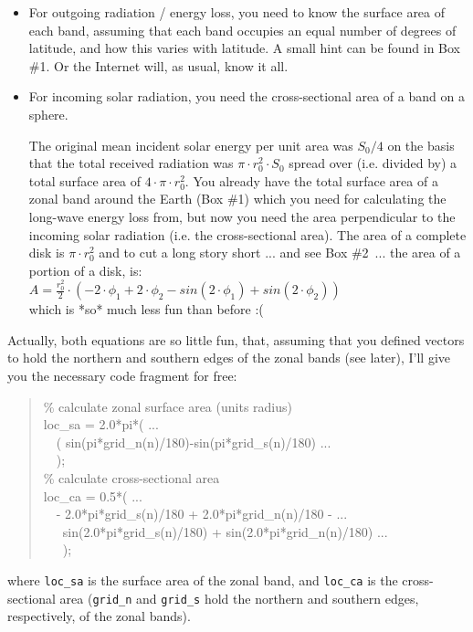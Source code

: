 \documentclass{tufte-book} %
\newenvironment{docspec}{\begin{quotation}\ttfamily\parskip0pt\parindent0pt\ignorespaces}{\end{quotation}}
\begin{document}
\begin{itemize}[noitemsep]
\item For outgoing radiation / energy loss, you need to know the surface area of each band, assuming that each band occupies an equal number of degrees of latitude, and how this varies with latitude. A small hint can be found in  Box \#1. Or the Internet will, as usual, know it all.
\item For incoming solar radiation, you need the cross-sectional area of a band on a sphere.



The original mean incident solar energy per unit area was \(S_{0}/4\) on the basis that the total received radiation was \(\pi\cdot r^{2}_0\cdot S_{0}\) spread over (i.e. divided by) a total surface area of \(4\cdot \pi\cdot r^{2}_0\). You already have the total surface area of a zonal band around the Earth (Box \#1) which you need for calculating the long-wave energy loss from, but now you need the area perpendicular to the incoming solar radiation (i.e. the cross-sectional area). The area of a complete disk is \(\pi\cdot r^{2}_0\) and to cut a long story short ... and  see Box \#2\ ...
the area of a portion of a disk, is:
\vspace{1mm}
\\\(A = \frac{r^{2}_{0}}{2}\cdot(-2\cdot\phi_{1}+2\cdot\phi_{2}-sin(2\cdot \phi_{1})+sin(2\cdot \phi_{2}))\)
\vspace{1mm}
\\\noindent which is *so* much less fun than before :( 
\end{itemize}
Actually, both equations are so little fun, that, assuming that you defined vectors to hold the northern and southern edges of the zonal bands (see later), I'll give you the necessary code fragment for free:
\begin{docspec}    
\% calculate zonal surface area (units radius)
\\loc\_sa = 2.0*pi*( ...
\\ \ \ ( sin(pi*grid\_n(n)/180)-sin(pi*grid\_s(n)/180) ...
\\ \ \  );
\\\% calculate cross-sectional area
\\loc\_ca = 0.5*( ...
\\ \ \ - 2.0*pi*grid\_s(n)/180 + 2.0*pi*grid\_n(n)/180 - ...
\\ \ \ \ sin(2.0*pi*grid\_s(n)/180) + sin(2.0*pi*grid\_n(n)/180) ...
\\ \ \ \ );
\end{docspec}
\noindent where \texttt{loc\_sa} is the surface area of the zonal band, and \texttt{loc\_ca} is the cross-sectional area (\texttt{grid\_n} and \texttt{grid\_s} hold the northern and southern edges, respectively, of the zonal bands).
\end{document}
